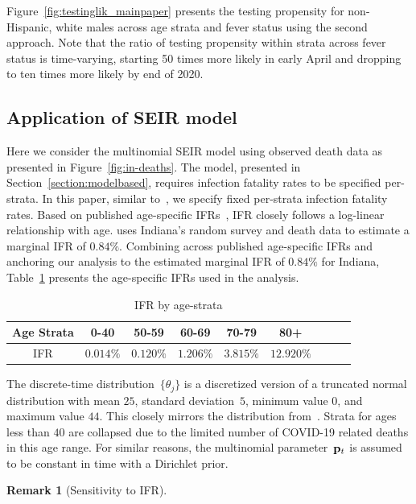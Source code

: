\documentclass[11pt]{amsart}
\numberwithin{equation}{section}
\theoremstyle{plain}
\newtheorem{remark}{Remark}
\begin{document}
 Figure~\ref{fig:testinglik_mainpaper} presents the testing propensity for non-Hispanic, white males across age strata and fever status using the second approach.  Note that the ratio of testing propensity within strata across fever status is time-varying, starting 50 times more likely in early April and dropping to ten times more likely by end of 2020.



 \subsection{Application of SEIR model}
 \label{section:application_of_modelbased}

 Here we consider the multinomial SEIR model using observed death data as presented in Figure~\ref{fig:in-deaths}. The model, presented in Section~\ref{section:modelbased}, requires infection fatality rates to be specified per-strata.  In this paper, similar to~\cite{Johndrow2020}, we specify fixed per-strata infection fatality rates.  Based on published age-specific IFRs~\citep{Levin2020}, IFR closely follows a log-linear relationship with age. \cite{Ironse2103272118} uses Indiana's random survey and death data to estimate a marginal IFR of $0.84\%$.  Combining across published age-specific IFRs and anchoring our analysis to the estimated marginal IFR of $0.84\%$ for Indiana, Table~\ref{tab:ifrperage} presents the age-specific IFRs used in the analysis. \begin{table}[!th]
 \begin{tabular}{c | c c c c c c c c}
 Age Strata & 0-40 & 50-59 & 60-69 & 70-79 & 80+ \\ \hline
 IFR & $0.014\%$ & $0.120\%$ & $1.206\%$ & $3.815\%$ & $12.920\%$
 \end{tabular}
 \caption{IFR by age-strata}
 \label{tab:ifrperage}
 \vspace{-1cm}
 \end{table}
 The discrete-time distribution~$\{ \theta_{j} \}$ is a discretized version of a truncated normal distribution with mean $25$, standard deviation~$5$, minimum value $0$, and maximum value $44$.  This closely mirrors the distribution from~\cite{Johndrow2020}. Strata for ages less than $40$ are collapsed due to the limited number of COVID-19 related deaths in this age range. For similar reasons, the multinomial parameter~${\bf p}_t$ is assumed to be constant in time with a Dirichlet prior.

 \begin{remark}[Sensitivity to IFR]

 \end{remark}
\end{document}
